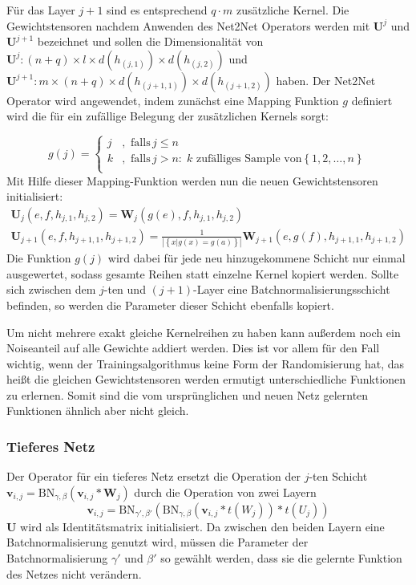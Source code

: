 Für das Layer $j+1$ sind es entsprechend $q \cdot m $ zusätzliche Kernel. Die Gewichtstensoren nachdem Anwenden des Net2Net Operators werden mit $\mathbf{U}^j$ und $\mathbf{U}^{j+1}$ bezeichnet und sollen die Dimensionalität von $\mathbf{U}^j: (n+q) \times l \times d(h_{(j,1)}) \times d(h_{(j,2)})$ und $\mathbf{U}^{j+1}: m \times (n+q) \times d(h_{(j+1,1)}) \times d(h_{(j+1,2)})$ haben. Der Net2Net Operator wird angewendet, indem zunächst eine Mapping Funktion $g$ definiert wird die für ein zufällige Belegung der zusätzlichen Kernels sorgt:

\begin{equation}
 g(j) =  
 \begin{cases}
 j & , \text{ falls} \, j \leq n \\
 k & , \text{ falls} \, j>n : \;  k \text{ zufälliges Sample von} \left\{ 1,2,\ldots, n \right\} \\ 
 \end{cases} 
 \end{equation}
 Mit Hilfe dieser Mapping-Funktion werden nun die neuen Gewichtstensoren initialisiert:
 \begin{align*}
 \mathbf{U}_j(e,f,h_{j,1},h_{j,2}) = \mathbf{W}_j(g(e),f,h_{j,1},h_{j,2}) \\
 \mathbf{U}_{j+1}(e,f,h_{j+1,1},h_{j+1,2})= \frac{1}{|\left\{ x | g(x)=g(a)\right\}|}\mathbf{W}_{j+1}(e,g(f),h_{j+1,1},h_{j+1,2})
 \end{align*}
Die Funktion $g(j)$ wird dabei für jede neu hinzugekommene Schicht nur einmal ausgewertet, sodass gesamte Reihen statt einzelne Kernel kopiert werden. Sollte sich zwischen dem $j$-ten und $(j+1)$-Layer eine Batchnormalisierungsschicht befinden, so werden die Parameter dieser Schicht ebenfalls kopiert.

Um nicht mehrere exakt gleiche Kernelreihen zu haben kann außerdem noch ein Noiseanteil auf alle Gewichte addiert werden. Dies ist vor allem für den Fall wichtig, wenn der Trainingsalgorithmus keine Form der Randomisierung hat, das heißt die gleichen Gewichtstensoren werden ermutigt unterschiedliche Funktionen zu erlernen. Somit sind die vom ursprünglichen und neuen Netz gelernten Funktionen ähnlich aber nicht gleich.

\subsubsection{Tieferes Netz}

Der Operator für ein tieferes Netz ersetzt die Operation der $j$-ten Schicht $\mathbf{v}_{i,j} = \text{BN}_{\gamma,\beta}( \mathbf{v}_{i,j}* \mathbf{W}_{j})$ durch die Operation von zwei Layern  
\begin{equation}
\mathbf{v}_{i,j} =\text{BN}_{\gamma',\beta'}( \text{BN}_{\gamma,\beta}( \mathbf{v}_{i,j} * t(W_{j})) * t(U_{j})    )
\end{equation}
$\mathbf{U}$ wird als Identitätsmatrix initialisiert.
Da zwischen den beiden Layern eine Batchnormalisierung genutzt wird, müssen die Parameter der Batchnormalisierung $\gamma'$ und $\beta'$ so gewählt werden, dass sie die gelernte Funktion des Netzes nicht verändern.


